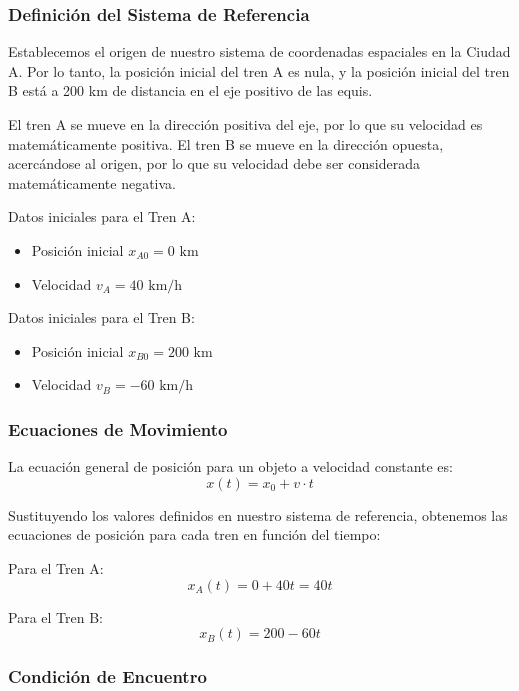 \documentclass[12pt, a4paper]{article}
\begin{document}
\subsubsection*{Definición del Sistema de Referencia}

Establecemos el origen de nuestro sistema de coordenadas espaciales en la Ciudad A. Por lo tanto, la posición inicial del tren A es nula, y la posición inicial del tren B está a 200 km de distancia en el eje positivo de las equis. 

El tren A se mueve en la dirección positiva del eje, por lo que su velocidad es matemáticamente positiva. El tren B se mueve en la dirección opuesta, acercándose al origen, por lo que su velocidad debe ser considerada matemáticamente negativa.

Datos iniciales para el Tren A:
\begin{itemize}
    \item Posición inicial $x_{A0} = 0 \text{ km}$
    \item Velocidad $v_A = 40 \text{ km/h}$
\end{itemize}

Datos iniciales para el Tren B:
\begin{itemize}
    \item Posición inicial $x_{B0} = 200 \text{ km}$
    \item Velocidad $v_B = -60 \text{ km/h}$
\end{itemize}

\subsubsection*{Ecuaciones de Movimiento}

La ecuación general de posición para un objeto a velocidad constante es:
\begin{equation}
x(t) = x_0 + v \cdot t
\end{equation}

Sustituyendo los valores definidos en nuestro sistema de referencia, obtenemos las ecuaciones de posición para cada tren en función del tiempo:

Para el Tren A:
\begin{equation}
x_A(t) = 0 + 40t = 40t
\end{equation}

Para el Tren B:
\begin{equation}
x_B(t) = 200 - 60t
\end{equation}

\subsubsection*{Condición de Encuentro}
\end{document}

